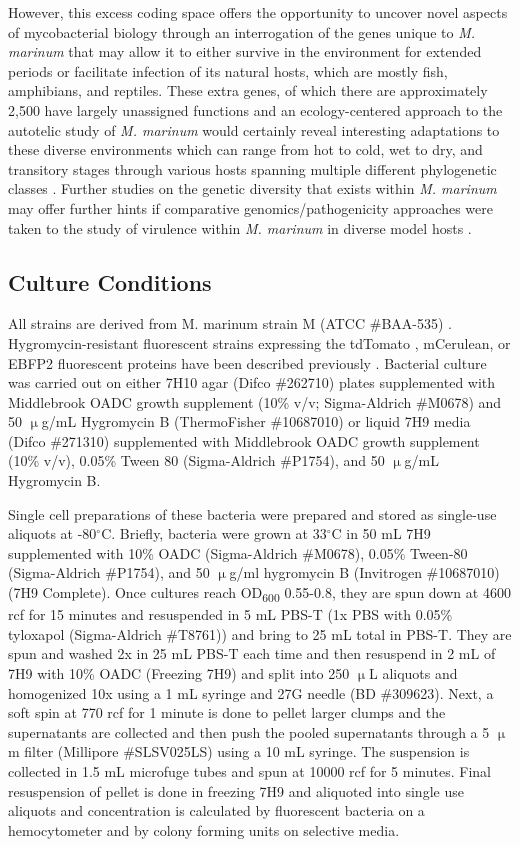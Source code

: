 However, this excess coding space offers the opportunity to uncover novel aspects of mycobacterial biology through an interrogation of the genes unique to \textit{M. marinum} that may allow it to either survive in the environment for extended periods or facilitate infection of its natural hosts, which are mostly fish, amphibians, and reptiles. These extra genes, of which there are approximately 2,500 have largely unassigned functions and an ecology-centered approach to the autotelic study of \textit{M. marinum} would certainly reveal interesting adaptations to these diverse environments which can range from hot to cold, wet to dry, and transitory stages through various hosts spanning multiple different phylogenetic classes \citep{Stinear2000, Stamm2004}. Further studies on the genetic diversity that exists within \textit{M. marinum} may offer further hints if comparative genomics/pathogenicity approaches were taken to the study of virulence within \textit{M. marinum} in diverse model hosts \citep{Das2018}.

\subsection{Culture Conditions}\label{marcult}

All strains are derived from M. marinum strain M (ATCC \#BAA-535) \citep{Ramakrishnan1994}. Hygromycin-resistant fluorescent strains expressing the tdTomato \citep{Oehlers2015} , mCerulean, or EBFP2 fluorescent proteins have been described previously \citep{Takaki2013}. Bacterial culture was carried out on either 7H10 agar (Difco \#262710) plates supplemented with Middlebrook OADC growth supplement (10\% v/v; Sigma-Aldrich \#M0678) and 50 $\upmu$g/mL Hygromycin B (ThermoFisher \#10687010) or liquid 7H9 media (Difco \#271310) supplemented with Middlebrook OADC growth supplement (10\% v/v), 0.05\% Tween 80 (Sigma-Aldrich \#P1754), and 50 $\upmu$g/mL Hygromycin B. 

Single cell preparations of these bacteria were prepared and stored as single-use aliquots at -80$^{\circ}$C. Briefly, bacteria were grown at 33$^{\circ}$C in 50 mL 7H9 supplemented with 10\% OADC (Sigma-Aldrich \#M0678), 0.05\% Tween-80 (Sigma-Aldrich \#P1754), and 50 $\upmu$g/ml hygromycin B (Invitrogen \#10687010) (7H9 Complete). Once cultures reach OD\textsubscript{600} 0.55-0.8, they are spun down at 4600 rcf for 15 minutes and resuspended in 5 mL PBS-T (1x PBS with 0.05\% tyloxapol (Sigma-Aldrich \#T8761)) and bring to 25 mL total in PBS-T. They are spun and washed 2x in 25 mL PBS-T each time and then resuspend in 2 mL of 7H9 with 10\% OADC (Freezing 7H9) and split into 250 $\upmu$L aliquots and homogenized 10x using a 1 mL syringe and 27G needle (BD \#309623). Next, a soft spin at 770 rcf for 1 minute is done to pellet larger clumps and the supernatants are collected and then push the pooled supernatants through a 5 $\upmu$m filter (Millipore \#SLSV025LS) using a 10 mL syringe. The suspension is collected in 1.5 mL microfuge tubes and spun at 10000 rcf for 5 minutes. Final resuspension of pellet is done in freezing 7H9 and aliquoted into single use aliquots and concentration is calculated by fluorescent bacteria on a hemocytometer and by colony forming units on selective media.

